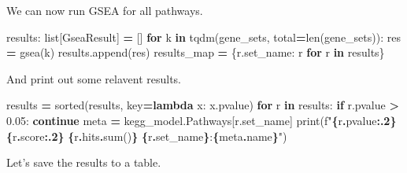 \documentclass[
]{book}
\newenvironment{Shaded}{\begin{snugshade}}{\end{snugshade}}
\newcommand{\BuiltInTok}[1]{#1}
\newcommand{\ControlFlowTok}[1]{\textcolor[rgb]{0.13,0.29,0.53}{\textbf{#1}}}
\newcommand{\FloatTok}[1]{\textcolor[rgb]{0.00,0.00,0.81}{#1}}
\newcommand{\KeywordTok}[1]{\textcolor[rgb]{0.13,0.29,0.53}{\textbf{#1}}}
\newcommand{\NormalTok}[1]{#1}
\newcommand{\OperatorTok}[1]{\textcolor[rgb]{0.81,0.36,0.00}{\textbf{#1}}}
\newcommand{\SpecialCharTok}[1]{\textcolor[rgb]{0.81,0.36,0.00}{\textbf{#1}}}
\newcommand{\SpecialStringTok}[1]{\textcolor[rgb]{0.31,0.60,0.02}{#1}}
\begin{document}
We can now run GSEA for all pathways.

\begin{Shaded}
\begin{Highlighting}[numbers=left,,]
\NormalTok{results: }\BuiltInTok{list}\NormalTok{[GseaResult] }\OperatorTok{=}\NormalTok{ []}
\ControlFlowTok{for}\NormalTok{ k }\KeywordTok{in}\NormalTok{ tqdm(gene\_sets, total}\OperatorTok{=}\BuiltInTok{len}\NormalTok{(gene\_sets)):}
\NormalTok{    res }\OperatorTok{=}\NormalTok{ gsea(k)}
\NormalTok{    results.append(res)}
\NormalTok{results\_map }\OperatorTok{=}\NormalTok{ \{r.set\_name: r }\ControlFlowTok{for}\NormalTok{ r }\KeywordTok{in}\NormalTok{ results\}}
\end{Highlighting}
\end{Shaded}

And print out some relavent results.

\begin{Shaded}
\begin{Highlighting}[numbers=left,,]
\NormalTok{results }\OperatorTok{=} \BuiltInTok{sorted}\NormalTok{(results, key}\OperatorTok{=}\KeywordTok{lambda}\NormalTok{ x: x.pvalue)}
\ControlFlowTok{for}\NormalTok{ r }\KeywordTok{in}\NormalTok{ results:}
    \ControlFlowTok{if}\NormalTok{ r.pvalue }\OperatorTok{\textgreater{}} \FloatTok{0.05}\NormalTok{: }\ControlFlowTok{continue}
\NormalTok{    meta }\OperatorTok{=}\NormalTok{ kegg\_model.Pathways[r.set\_name]}
    \BuiltInTok{print}\NormalTok{(}\SpecialStringTok{f"}\SpecialCharTok{\{}\NormalTok{r}\SpecialCharTok{.}\NormalTok{pvalue}\SpecialCharTok{:.2\}}\SpecialStringTok{ }\SpecialCharTok{\{}\NormalTok{r}\SpecialCharTok{.}\NormalTok{score}\SpecialCharTok{:.2\}}\SpecialStringTok{ }\SpecialCharTok{\{}\NormalTok{r}\SpecialCharTok{.}\NormalTok{hits}\SpecialCharTok{.}\BuiltInTok{sum}\NormalTok{()}\SpecialCharTok{\}}\SpecialStringTok{ }\SpecialCharTok{\{}\NormalTok{r}\SpecialCharTok{.}\NormalTok{set\_name}\SpecialCharTok{\}}\SpecialStringTok{:}\SpecialCharTok{\{}\NormalTok{meta}\SpecialCharTok{.}\NormalTok{name}\SpecialCharTok{\}}\SpecialStringTok{"}\NormalTok{)}
\end{Highlighting}
\end{Shaded}

Let's save the results to a table.
\end{document}
